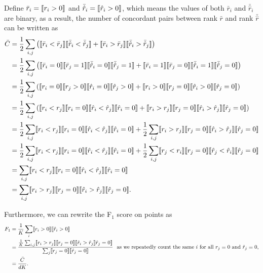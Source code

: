 Define $\bar{r}_i = \llbracket r_i > 0 \rrbracket$ and $\bar{\hat{r}}_i = \llbracket \hat{r}_i > 0 \rrbracket$,
which means the values of both $\bar{r}_i$ and $\bar{\hat{r}}_i$ are binary, as a result,
the number of concordant pairs between rank $\bar{r}$ and rank $\bar{\hat{r}}$ can be written as
\begin{align*}
\bar{C} &= \frac{1}{2} \sum_{i,j} \left(
           \llbracket \bar{r}_i < \bar{r}_j \rrbracket  \llbracket \bar{\hat{r}}_i < \bar{\hat{r}}_j \rrbracket +
           \llbracket \bar{r}_i > \bar{r}_j \rrbracket  \llbracket \bar{\hat{r}}_i > \bar{\hat{r}}_j \rrbracket \right) \\
        &= \frac{1}{2} \sum_{i,j} \left(
           \llbracket \bar{r}_i = 0 \rrbracket  \llbracket \bar{r}_j = 1 \rrbracket  \llbracket \bar{\hat{r}}_i = 0 \rrbracket  \llbracket \bar{\hat{r}}_j = 1 \rrbracket +
           \llbracket \bar{r}_i = 1 \rrbracket  \llbracket \bar{r}_j = 0 \rrbracket  \llbracket \bar{\hat{r}}_i = 1 \rrbracket  \llbracket \bar{\hat{r}}_j = 0 \rrbracket \right) \\
        &= \frac{1}{2} \sum_{i,j} \left(
           \llbracket r_i = 0 \rrbracket  \llbracket r_j > 0 \rrbracket  \llbracket \hat{r}_i = 0 \rrbracket  \llbracket \hat{r}_j > 0 \rrbracket +
           \llbracket r_i > 0 \rrbracket  \llbracket r_j = 0 \rrbracket  \llbracket \hat{r}_i > 0 \rrbracket  \llbracket \hat{r}_j = 0 \rrbracket \right) \\
        &= \frac{1}{2} \sum_{i,j} \left(
           \llbracket r_i < r_j \rrbracket  \llbracket r_i = 0 \rrbracket  \llbracket \hat{r}_i < \hat{r}_j \rrbracket  \llbracket \hat{r}_i = 0 \rrbracket +
           \llbracket r_i > r_j \rrbracket  \llbracket r_j = 0 \rrbracket  \llbracket \hat{r}_i > \hat{r}_j \rrbracket  \llbracket \hat{r}_j = 0 \rrbracket \right) \\
        &= \frac{1}{2} \sum_{i,j} \llbracket r_i < r_j \rrbracket  \llbracket r_i = 0 \rrbracket  \llbracket \hat{r}_i < \hat{r}_j \rrbracket  \llbracket \hat{r}_i = 0 \rrbracket +
           \frac{1}{2} \sum_{i,j} \llbracket r_i > r_j \rrbracket  \llbracket r_j = 0 \rrbracket  \llbracket \hat{r}_i > \hat{r}_j \rrbracket  \llbracket \hat{r}_j = 0 \rrbracket \\
        &= \frac{1}{2} \sum_{i,j} \llbracket r_i < r_j \rrbracket  \llbracket r_i = 0 \rrbracket  \llbracket \hat{r}_i < \hat{r}_j \rrbracket  \llbracket \hat{r}_i = 0 \rrbracket +
           \frac{1}{2} \sum_{i,j} \llbracket r_j < r_i \rrbracket  \llbracket r_j = 0 \rrbracket  \llbracket \hat{r}_j < \hat{r}_i \rrbracket  \llbracket \hat{r}_j = 0 \rrbracket \\
        &= \sum_{i,j} \llbracket r_i < r_j \rrbracket  \llbracket r_i = 0 \rrbracket  \llbracket \hat{r}_i < \hat{r}_j \rrbracket  \llbracket \hat{r}_i = 0 \rrbracket \\
        &= \sum_{i,j} \llbracket r_i > r_j \rrbracket  \llbracket r_j = 0 \rrbracket  \llbracket \hat{r}_i > \hat{r}_j \rrbracket  \llbracket \hat{r}_j = 0 \rrbracket.
\end{align*}

Furthermore, we can rewrite the F$_1$ score on points as 
\begin{align*}
F_1 &= \frac{1}{K} \sum_i \llbracket r_i > 0 \rrbracket  \llbracket \hat{r}_i > 0 \rrbracket \\
    &= \frac{\frac{1}{K} \sum_{i,j} \llbracket r_i > r_j \rrbracket  \llbracket r_j = 0 \rrbracket  \llbracket \hat{r}_i > \hat{r}_j \rrbracket  \hat{r}_j = 0 \rrbracket}
            {\sum_j \llbracket r_j = 0 \rrbracket  \llbracket \hat{r}_j = 0 \rrbracket} ~~ 
            \text{as we repeatedly count the same $i$ for all $r_j = 0$ and $\hat{r}_j = 0$}, \\
    &= \frac{\bar{C}} {dK}.
\end{align*}

